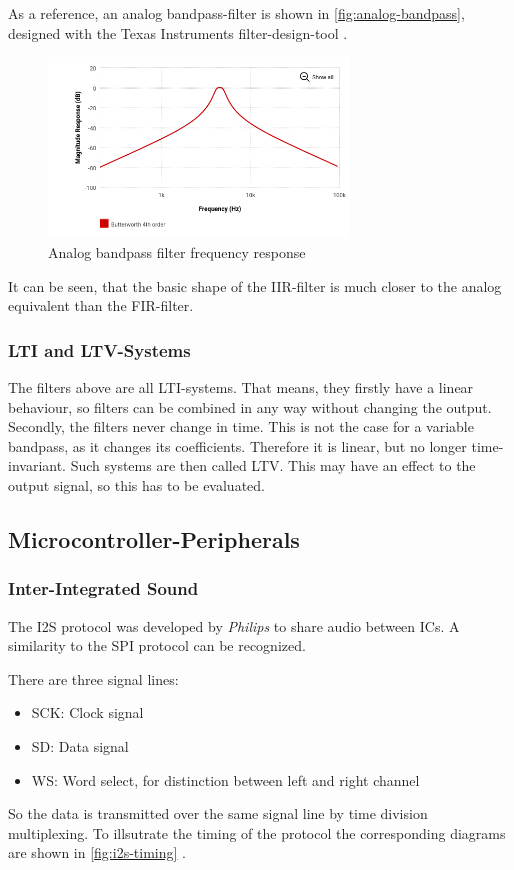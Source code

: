 As a reference, an analog bandpass-filter is shown in \autoref{fig:analog-bandpass}, designed with the Texas Instruments
filter-design-tool \cite{TI-filterdesign-tool}.

\begin{figure}[!h]
    \centering
    \includegraphics[width=8cm]{img/analog_bandpass.png}
    \caption{Analog bandpass filter frequency response}
    \label{fig:analog-bandpass}
\end{figure}

It can be seen, that the basic shape of the \ac{IIR}-filter is much closer to the analog equivalent than the
\ac{FIR}-filter.

\subsubsection{LTI and LTV-Systems} %

The filters above are all \ac{LTI}-systems. That means, they firstly have a linear behaviour, so filters can be
combined in any way without changing the output. Secondly, the filters never change in time.
This is not the case for a variable bandpass, as it changes its coefficients. Therefore it is linear, but no
longer time-invariant. Such systems are then called \ac{LTV}.
This may have an effect to the output signal, so this has to be evaluated.

\subsection{Microcontroller-Peripherals}

\subsubsection{Inter-Integrated Sound}

The \ac{I2S} protocol was developed by \textit{Philips} to share audio between \acp{IC}.
A similarity to the \ac{SPI} protocol can be recognized.

There are three signal lines:
\begin{itemize}
    \item SCK: Clock signal
    \item SD: Data signal
    \item WS: Word select, for distinction between left and right channel
\end{itemize}
So the data is transmitted over the same signal line by time division multiplexing. 
To illsutrate the timing of the protocol the corresponding diagrams are shown in \autoref{fig:i2s-timing} \cite{nxp_i2s}.

